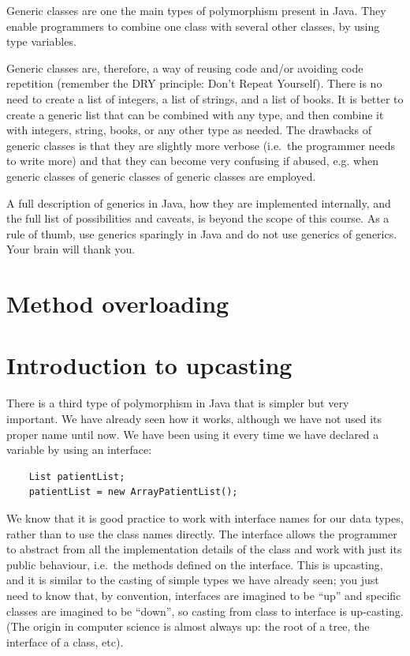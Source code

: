 Generic classes are one the main types of polymorphism present in
Java. They enable programmers to combine one class with several other
classes, by using type variables. 

Generic classes are, therefore, a way of reusing code and/or avoiding
code repetition (remember the DRY principle: Don't Repeat Yourself). 
There is no need to create a list of integers, a list of
strings, and a list of books. It is better to create a generic list
that can be combined with any type, and then combine it with integers,
string, books, or any other type as needed. The drawbacks of generic
classes is that they are slightly more verbose (i.e.~the programmer
needs to write more) and that they can become very confusing if
abused, e.g. when generic classes of generic classes of generic
classes are employed. 

A full description of generics in Java, how they are implemented
internally, and the full list of possibilities and caveats, is beyond
the scope of this course. As a rule of thumb, use generics sparingly in
Java and do not use generics of generics. Your brain will thank you. 


\section{Method overloading}
\label{sec:method-overloading}



\section{Introduction to upcasting}
\label{sec:upcasting}

There is a third type of
polymorphism in Java that is simpler but very important. We have
already seen how it works, although we have not used its proper name
until now.
We have been using it every time we have declared
a variable by using an interface: 

\begin{verbatim}
    List patientList;
    patientList = new ArrayPatientList();
\end{verbatim}

We know that it is good practice to work with interface names for our
data types, rather than to use the class names directly. The interface
allows the programmer to abstract from all the implementation details
of the class and work with just its public behaviour, i.e.~the methods
defined on the interface. This is upcasting, and it is similar to the
casting of simple types we have already seen; you just need to know
that, by convention, interfaces are imagined to be ``up'' and specific
classes are imagined to be ``down'', so casting from class to
interface is up-casting. (The origin in computer science is almost
always up: the root of a tree, the interface of a class, etc). 

